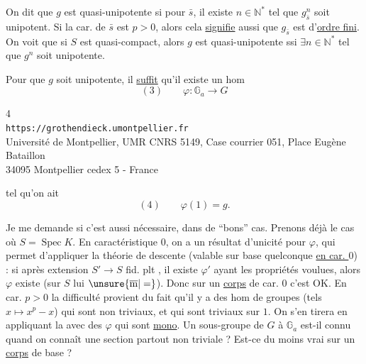On dit que $g$ est quasi-unipotente si pour  $\bar s$, il existe
$n\in\mathbb N^*$ tel que $g_{\bar s}^{n}$ soit unipotent.
Si la car. de $\bar s$ est $p>0$, alors cela \uline{signifie} aussi que
$g_{\bar s}$ est d'\uline{ordre fini}. On voit que si $S$ est
quasi-compact, alors $g$ est quasi-unipotente ssi
$\exists n\in\mathbb N^*$ tel que $g^n$ soit unipotente.


 Pour que $g$ soit unipotente, il \uline{suffit} qu'il existe un hom
\[
(3)\qquad \varphi:\mathbb G_a\longrightarrow G
\]

\begin{center}
\small
4\\
\texttt{https://grothendieck.umontpellier.fr}\\
Université de Montpellier, UMR CNRS 5149, Case courrier 051, Place Eugène Bataillon\\
34095 Montpellier cedex 5 - France
\end{center}


tel qu'on ait
\[
(4)\qquad \varphi(1)=g.
\]

Je me demande si c'est aussi nécessaire, dans de ``bons'' cas. Prenons déjà le
cas où $S=\operatorname{Spec}K$. En caractéristique $0$, on a un résultat
d'unicité pour $\varphi$, qui permet d'appliquer la théorie de descente
(valable sur base quelconque \uline{en car. $0$}) : si après extension
$S'\longrightarrow S$ fid. plt , il existe $\varphi'$ ayant
les propriétés voulues, alors $\varphi$ existe
(sur $S$ lui $\unsure{\overline{\mathrm m}|=}$).
Donc sur un \uline{corps} de car. $0$ c'est OK. En car. $p>0$ la difficulté
provient du fait qu'il y a des hom de groupes
(tels $x\mapsto x^p-x$) qui sont  non triviaux, et qui sont
triviaux sur $1$. On s'en tirera  en appliquant
la  avec des $\varphi$ qui sont \uline{mono}.
 
Un sous-groupe de $G$  à $\mathbb G_a$ est-il connu quand
on connaît une section partout non triviale ? Est-ce du moins vrai sur un
\uline{corps} de base ?

